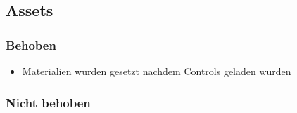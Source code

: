 \subsection{Assets}
\subsubsection{Behoben}
\begin{itemize}
    \item Materialien wurden gesetzt nachdem Controls geladen wurden
\end{itemize}
\subsubsection{Nicht behoben}